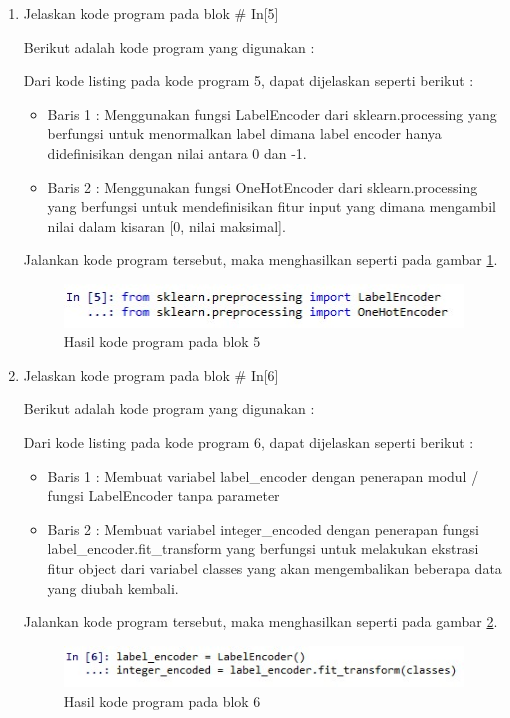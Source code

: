 \begin{enumerate}
\item Jelaskan kode program pada blok \# In[5]
	\par Berikut adalah kode program yang digunakan :
	
	\par Dari kode listing pada kode program 5, dapat dijelaskan seperti berikut :
	\begin{itemize}
	\item Baris 1	: Menggunakan fungsi LabelEncoder dari sklearn.processing yang berfungsi untuk menormalkan label dimana label encoder hanya didefinisikan dengan nilai antara 0 dan -1.
	\item Baris 2	: Menggunakan fungsi OneHotEncoder dari sklearn.processing yang berfungsi untuk mendefinisikan fitur input yang dimana mengambil nilai dalam kisaran [0, nilai maksimal].
	\end{itemize}
	\par Jalankan kode program tersebut, maka menghasilkan seperti pada gambar \ref{andri5}.
		\begin{figure}[!hbtp]
		\centering
		\includegraphics[scale=0.5]{figures/chapter7/andri5.jpg}
		\caption{Hasil kode program pada blok 5}
		\label{andri5}
		\end{figure}
	
\item Jelaskan kode program pada blok \# In[6]
	\par Berikut adalah kode program yang digunakan :
	
	\par Dari kode listing pada kode program 6, dapat dijelaskan seperti berikut :
	\begin{itemize}
	\item Baris 1	: Membuat variabel label\_encoder dengan penerapan modul / fungsi LabelEncoder tanpa parameter
	\item Baris 2	: Membuat variabel integer\_encoded dengan penerapan fungsi label\_encoder.fit\_transform yang berfungsi untuk melakukan ekstrasi fitur object dari variabel classes yang akan mengembalikan beberapa data yang diubah kembali.
	\end{itemize}
	\par Jalankan kode program tersebut, maka menghasilkan seperti pada gambar \ref{andri6}.
		\begin{figure}[!hbtp]
		\centering
		\includegraphics[scale=0.5]{figures/chapter7/andri6.jpg}
		\caption{Hasil kode program pada blok 6}
		\label{andri6}
		\end{figure}


\end{enumerate}
